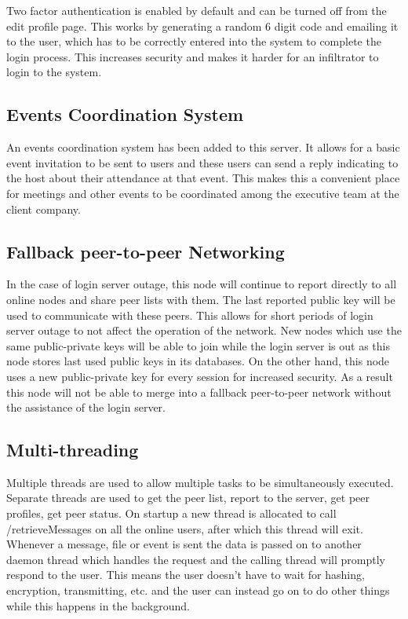 \documentclass[a4paper,10pt,twoside]{article}
\begin{document}
Two factor authentication is enabled by default and can be turned off from the edit profile page. This works by generating a random 6 digit code and emailing it to the user, which has to be correctly entered into the system to complete the login process. This increases security and makes it harder for an infiltrator to login to the system.

\subsection{Events Coordination System}

An events coordination system has been added to this server. It allows for a basic event invitation to be sent to users and these users can send a reply indicating to the host about their attendance at that event. This makes this a convenient place for meetings and other events to be coordinated among the executive team at the client company.

\subsection{Fallback peer-to-peer Networking}

In the case of login server outage, this node will continue to report directly to all online nodes and share peer lists with them. The last reported public key will be used to communicate with these peers. This allows for short periods of login server outage to not affect the operation of the network. New nodes which use the same public-private keys will be able to join while the login server is out as this node stores last used public keys in its databases. On the other hand, this node uses a new public-private key for every session for increased security. As a result this node will not be able to merge into a fallback peer-to-peer network without the assistance of the login server.

\subsection{Multi-threading}

Multiple threads are used to allow multiple tasks to be simultaneously executed. Separate threads are used to get the peer list, report to the server, get peer profiles, get peer status. On startup a new thread is allocated to call /retrieveMessages on all the online users, after which this thread will exit. Whenever a message, file or event is sent the data is passed on to another daemon thread which handles the request and the calling thread will promptly respond to the user. This means the user doesn't have to wait for hashing, encryption, transmitting, etc. and the user can instead go on to do other things while this happens in the background.
\end{document}
